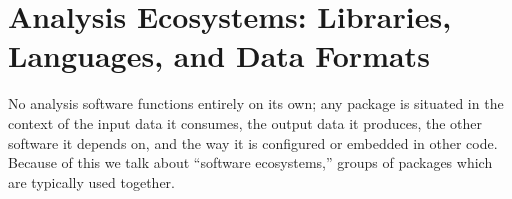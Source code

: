 
\section{Analysis Ecosystems: Libraries, Languages, and Data Formats}
No analysis software functions entirely on its own; any package is situated in the context of the input data it consumes, the output data it produces, the other software it depends on, and the way it is configured or embedded in other code. Because of this we talk about ``software ecosystems,'' groups of packages which are typically used together.

